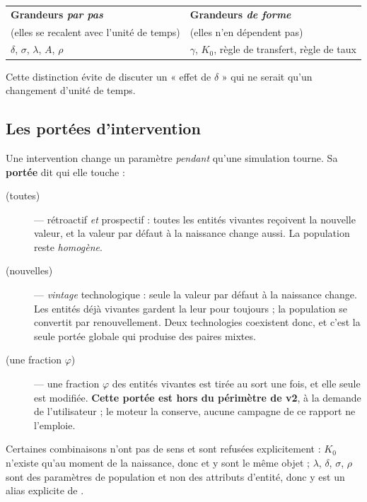 \begin{center}\footnotesize
\begin{tabular}{@{}p{6.4cm}p{6.4cm}@{}}
\toprule
\textbf{Grandeurs \emph{par pas}} & \textbf{Grandeurs \emph{de forme}} \\
(elles se recalent avec l'unité de temps) & (elles n'en dépendent pas) \\
\midrule
$\delta$, $\sigma$, $\lambda$, $A$, $\rho$ &
$\gamma$, $K_0$, règle de transfert, règle de taux \\
\bottomrule
\end{tabular}
\end{center}

\noindent Cette distinction évite de discuter un « effet de $\delta$ » qui ne
serait qu'un changement d'unité de temps.

\subsection{Les portées d'intervention}
\label{sec:portees}

Une intervention change un paramètre \emph{pendant} qu'une simulation tourne.
Sa \textbf{portée} dit qui elle touche :

\begin{description}
\item[ (toutes)] --- rétroactif \emph{et} prospectif : toutes les
  entités vivantes reçoivent la nouvelle valeur, et la valeur par défaut à la
  naissance change aussi. La population reste \emph{homogène}.
\item[ (nouvelles)] --- \emph{vintage} technologique : seule la
  valeur par défaut à la naissance change. Les entités déjà vivantes gardent
  la leur pour toujours ; la population se convertit par renouvellement. Deux
  technologies coexistent donc, et c'est la seule portée globale qui produise
  des paires mixtes.
\item[ (une fraction $\varphi$)] --- une fraction $\varphi$
  des entités vivantes est tirée au sort une fois, et elle seule est
  modifiée. \textbf{Cette portée est hors du périmètre de v2}, à la demande
  de l'utilisateur ; le moteur la conserve, aucune campagne de ce rapport ne
  l'emploie.
\end{description}

Certaines combinaisons n'ont pas de sens et sont refusées explicitement :
$K_0$ n'existe qu'au moment de la naissance, donc  et  y
sont le même objet ; $\lambda$, $\delta$, $\sigma$, $\rho$ sont des
paramètres de population et non des attributs d'entité, donc  y est
un alias explicite de .
